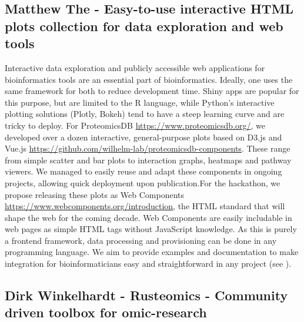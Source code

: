 \subsection{Matthew The - Easy-to-use interactive HTML plots collection for data exploration and web tools}

Interactive data exploration and publicly accessible web applications for bioinformatics tools are an essential part of bioinformatics. Ideally, one uses the same framework for both to reduce development time. Shiny apps are popular for this purpose, but are limited to the R language, while Python’s interactive plotting solutions (Plotly, Bokeh) tend to have a steep learning curve and are tricky to deploy. For ProteomicsDB \url{https://www.proteomicsdb.org/}, we developed over a dozen interactive, general-purpose plots based on D3.js and Vue.js \url{https://github.com/wilhelm-lab/proteomicsdb-components}. These range from simple scatter and bar plots to interaction graphs, heatmaps and pathway viewers. We managed to easily reuse and adapt these components in ongoing projects, allowing quick deployment upon publication.For the hackathon, we propose releasing these plots as Web Components \url{https://www.webcomponents.org/introduction}, the HTML standard that will shape the web for the coming decade. Web Components are easily includable in web pages as simple HTML tags without JavaScript knowledge. As this is purely a frontend framework, data processing and provisioning can be done in any programming language. We aim to provide examples and documentation to make integration for bioinformaticians easy and straightforward in any project (see \citep{issue11}).

\subsection{Dirk Winkelhardt - Rusteomics - Community driven toolbox for omic-research}


